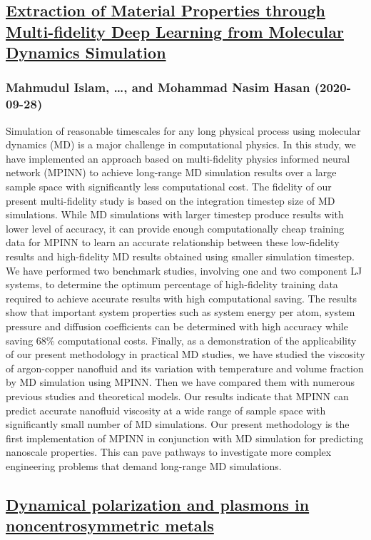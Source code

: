 \subsection*{\href{http://arxiv.org/abs/2009.13106v2}{Extraction of Material Properties through Multi-fidelity Deep Learning  from Molecular Dynamics Simulation}}
\subsubsection*{Mahmudul Islam, \dots, and Mohammad Nasim Hasan (2020-09-28)}
Simulation of reasonable timescales for any long physical process using
molecular dynamics (MD) is a major challenge in computational physics. In this
study, we have implemented an approach based on multi-fidelity physics informed
neural network (MPINN) to achieve long-range MD simulation results over a large
sample space with significantly less computational cost. The fidelity of our
present multi-fidelity study is based on the integration timestep size of MD
simulations. While MD simulations with larger timestep produce results with
lower level of accuracy, it can provide enough computationally cheap training
data for MPINN to learn an accurate relationship between these low-fidelity
results and high-fidelity MD results obtained using smaller simulation
timestep. We have performed two benchmark studies, involving one and two
component LJ systems, to determine the optimum percentage of high-fidelity
training data required to achieve accurate results with high computational
saving. The results show that important system properties such as system energy
per atom, system pressure and diffusion coefficients can be determined with
high accuracy while saving 68\% computational costs. Finally, as a demonstration
of the applicability of our present methodology in practical MD studies, we
have studied the viscosity of argon-copper nanofluid and its variation with
temperature and volume fraction by MD simulation using MPINN. Then we have
compared them with numerous previous studies and theoretical models. Our
results indicate that MPINN can predict accurate nanofluid viscosity at a wide
range of sample space with significantly small number of MD simulations. Our
present methodology is the first implementation of MPINN in conjunction with MD
simulation for predicting nanoscale properties. This can pave pathways to
investigate more complex engineering problems that demand long-range MD
simulations.

\subsection*{\href{http://arxiv.org/abs/2009.13105v1}{Dynamical polarization and plasmons in noncentrosymmetric metals}}
